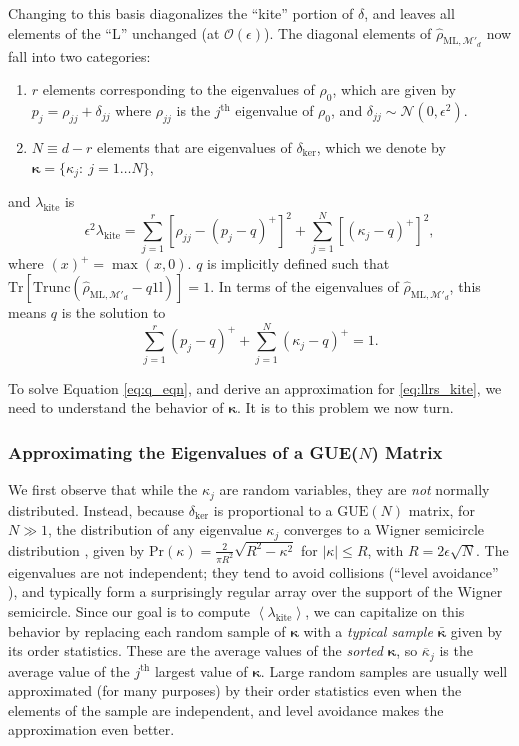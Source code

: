 \documentclass[aps,pra, twocolumn]{revtex4-1}
\newcommand{\M}{\mathcal{M}}
\newcommand{\Tr}{\mathrm{Tr}}
\newcommand{\Id}{\mathbb{I}}
\newcommand{\expect}[1]{\ensuremath{\left\langle#1\right\rangle}}
\def\Id{1\!\mathrm{l}}
\newcommand{\bvec}[1]{\boldsymbol{#1}}
\newcommand{\rhohat}{\hat{\rho}}
\newcommand{\rhoML}[1]{\rhohat_{\scriptscriptstyle{\mathrm{ML},#1}}}
\begin{document}
Changing to this basis diagonalizes the ``kite'' portion of $\delta$, and leaves all elements of the ``L'' unchanged (at $\mathcal{O}(\epsilon)$).  The diagonal elements of $\rhoML{\M'_{d}}$ now fall into two categories:
\begin{enumerate}[noitemsep]
\item $r$ elements corresponding to the eigenvalues of $\rho_0$, which are given by $p_{j} = \rho_{jj} + \delta_{jj}$ where  $\rho_{jj}$ is the $j^{\mathrm{th}}$ eigenvalue of $\rho_{0}$, and $\delta_{jj} \sim \mathcal{N}(0,\epsilon^2)$.
\item $N \equiv d-r$ elements that are eigenvalues of $\delta_{\mathrm{ker}}$, which we denote by $\bvec{\kappa} = \{\kappa_j:~j = 1\ldots 
N\}$,
\end{enumerate}
and $\lambda_{\mathrm{kite}}$ is
\begin{equation}
\label{eq:llrs_kite}
\epsilon^{2}\lambda_{\mathrm{kite}} = \sum_{j=1}^{r}[\rho_{jj}- (p_j-q)^{+}]^2 + \sum_{j=1}^{N}\left[(\kappa_j-q)^+\right]^2,
\end{equation}
where $(x)^{+} = \max(x, 0)$. $q$ is implicitly defined such that $\Tr\left[\mathrm{Trunc}(\rhoML{\M'_{d}} - q \Id)\right] = 1$. In terms of the eigenvalues of $\rhoML{\M'_{d}}$, this means $q$ is the solution to
\begin{equation}
\label{eq:q_eqn}
 \sum_{j=1}^{r}(p_j - q)^{+} + \sum_{j=1}^{N}{(\kappa_j-q)^+} = 1.
\end{equation}

To solve Equation \eqref{eq:q_eqn}, and derive an approximation for \eqref{eq:llrs_kite}, we need to understand the behavior of $\bvec{\kappa}$. It is to this problem we now turn.

\subsubsection{Approximating the Eigenvalues of a GUE($N$) Matrix}
We first observe that while the $\kappa_j$ are random variables, they are \emph{not} normally distributed.  Instead, because $\delta_{\mathrm{ker}}$ is proportional to a $\mathrm{GUE}(N)$ matrix, for $N\gg1$, the distribution of any eigenvalue $\kappa_{j}$
converges to a Wigner semicircle distribution \cite{Wigner1958}, given by $\mathrm{Pr}(\kappa) = \frac{2}{\pi R^{2}}\sqrt{R^{2}-\kappa^{2}}$ for $|\kappa| \leq R$, with $R = 2\epsilon\sqrt{N}$.  The eigenvalues are not independent; they tend to avoid collisions (``level avoidance'' \cite{Tao2013}), 
and typically form a surprisingly regular array over the support of the Wigner semicircle.  Since our goal is to compute $\expect{\lambda_{\mathrm{kite}}}$, we can capitalize on this behavior by replacing each random sample of $\bvec{\kappa}$ with a 
\emph{typical sample} $\bar{\bvec{\kappa}}$ given by its order statistics.  These are the average values of the \emph{sorted} 
$\bvec{\kappa}$, so $\overline{\kappa}_j$ is the average value of the $j^{\mathrm{th}}$ largest value of $\bvec{\kappa}$.  Large random samples 
are usually well approximated (for many purposes) by their order statistics even when the elements of the sample are 
independent, and level avoidance makes the approximation even better. 
\end{document}
